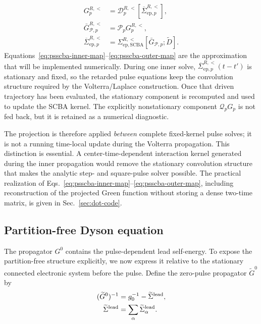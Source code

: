 \documentclass[
 reprint,
 superscriptaddress,
 amsmath,amssymb,
 aps,prb,
 longbibliography,
 floatfix
]{revtex4-2}
\newcommand{\ep}{\mathrm{ep}}
\newcommand{\barSigma}{\overline{\Sigma}}
\newcommand{\proj}{\mathcal P}
\newcommand{\qproj}{\mathcal Q}
\begin{document}
\begin{align}
G_p^{R,<}
&=
\mathcal D_p^{R,<}\!\left[\barSigma_{\ep,p}^{R,<}\right],
\label{eq:psscba-inner-map}
\\
\bar G_{\mathcal P,p}^{R,<}
&=
\proj_p G_p^{R,<},
\label{eq:psscba-project-map}
\\
\barSigma_{\ep,p}^{R,<}
&=
\Sigma_{\ep,\mathrm{SCBA}}^{R,<}
\!\left[\bar G_{\mathcal P,p};\widetilde D\right].
\label{eq:psscba-outer-map}
\end{align}
Equations~\eqref{eq:psscba-inner-map}--\eqref{eq:psscba-outer-map} are the approximation that will be implemented numerically. During one inner solve, \(\barSigma_{\ep,p}^{R,<}(t-t')\) is stationary and fixed, so the retarded pulse equations keep the convolution structure required by the Volterra/Laplace construction. Once that driven trajectory has been evaluated, the stationary component is recomputed and used to update the SCBA kernel. The explicitly nonstationary component \(\qproj_pG_p\) is not fed back, but it is retained as a numerical diagnostic.

The projection is therefore applied \emph{between} complete fixed-kernel pulse solves; it is not a running time-local update during the Volterra propagation. This distinction is essential. A center-time-dependent interaction kernel generated during the inner propagation would remove the stationary convolution structure that makes the analytic step- and square-pulse solver possible. The practical realization of Eqs.~\eqref{eq:psscba-inner-map}--\eqref{eq:psscba-outer-map}, including reconstruction of the projected Green function without storing a dense two-time matrix, is given in Sec.~\ref{sec:dot-code}.

\subsection{Partition-free Dyson equation}
\label{subsec:full-pf-dyson}

The propagator \(G^0\) contains the pulse-dependent lead
self-energy. To expose the partition-free structure explicitly, we
now express it relative to the stationary connected electronic
system before the pulse. Define the zero-pulse propagator
\(\widetilde G^0\) by
\begin{equation*}
\begin{aligned}
(\widetilde G^0)^{-1}
&=
g_0^{-1}
-
\widetilde\Sigma^{\rm lead},
\\
\widetilde\Sigma^{\rm lead}
&=
\sum_\alpha
\widetilde\Sigma_\alpha^{\rm lead}.
\end{aligned}
\end{equation*}
\end{document}
